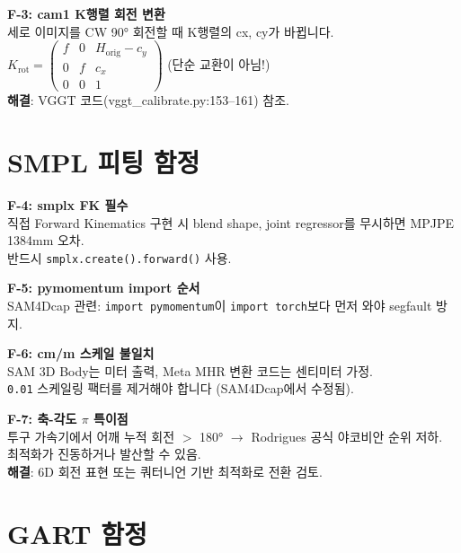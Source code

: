 \documentclass[11pt, a4paper]{report}
\begin{document}
\begin{failbox}
\textbf{F-3: cam1 K행렬 회전 변환}\\
세로 이미지를 CW 90° 회전할 때 K행렬의 cx, cy가 바뀝니다.\\
$K_{\text{rot}} = \begin{pmatrix} f & 0 & H_{\text{orig}} - c_y \\ 0 & f & c_x \\ 0 & 0 & 1 \end{pmatrix}$ (단순 교환이 아님!)\\
\textbf{해결}: VGGT 코드(vggt\_calibrate.py:153--161) 참조.
\end{failbox}


\section{SMPL 피팅 함정}

\begin{failbox}
\textbf{F-4: smplx FK 필수}\\
직접 Forward Kinematics 구현 시 blend shape, joint regressor를 무시하면 MPJPE 1384mm 오차.\\
반드시 \texttt{smplx.create().forward()} 사용.
\end{failbox}

\begin{failbox}
\textbf{F-5: pymomentum import 순서}\\
SAM4Dcap 관련: \texttt{import pymomentum}이 \texttt{import torch}보다 먼저 와야 segfault 방지.
\end{failbox}

\begin{failbox}
\textbf{F-6: cm/m 스케일 불일치}\\
SAM 3D Body는 미터 출력, Meta MHR 변환 코드는 센티미터 가정.\\
\texttt{0.01} 스케일링 팩터를 제거해야 합니다 (SAM4Dcap에서 수정됨).
\end{failbox}

\begin{failbox}
\textbf{F-7: 축-각도 $\pi$ 특이점}\\
투구 가속기에서 어깨 누적 회전 $>$ 180° $\to$ Rodrigues 공식 야코비안 순위 저하.\\
최적화가 진동하거나 발산할 수 있음.\\
\textbf{해결}: 6D 회전 표현 또는 쿼터니언 기반 최적화로 전환 검토.
\end{failbox}


\section{GART 함정}
\end{document}
